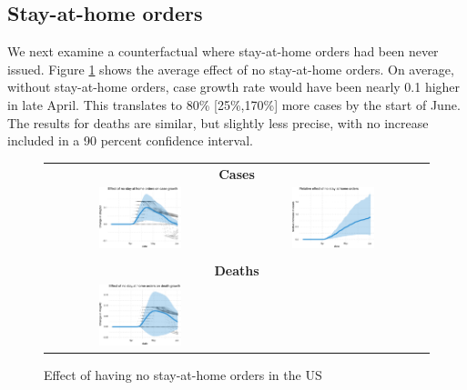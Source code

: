 \documentclass[11pt,reqno,letter]{amsart}
\theoremstyle{definition}
\begin{document}
\subsection{Stay-at-home orders}

We next examine a counterfactual where stay-at-home orders had been never
issued.  Figure \ref{fig:US-shelter} shows the average effect of no
stay-at-home orders. On average, without stay-at-home orders, case
growth rate would have been nearly 0.1 higher in late April. This
translates to 80\% [25\%,170\%] more cases by the start of June. The
results for deaths are similar, but slightly less precise, with no
increase included in a 90 percent confidence interval.

\begin{figure}[ht]
  \caption{Effect of having no stay-at-home orders in the US\label{fig:US-shelter}}
  \begin{minipage}{\linewidth}
    \centering
    \begin{tabular}{cc}
      \multicolumn{2}{c}{\textbf{Cases}} \\
      \includegraphics[width=0.45\textwidth]{tables_and_figures/us-shelter-dgrowth_v1}
      &
        \includegraphics[width=0.45\textwidth]{tables_and_figures/us-shelter-rel_v1}
      \\
      \\
      \multicolumn{2}{c}{\textbf{Deaths}} \\
      \includegraphics[width=0.45\textwidth]{tables_and_figures/us-shelter-dgrowth_deaths_v1}

\end{tabular}
\end{minipage}
\end{figure}
\end{document}
